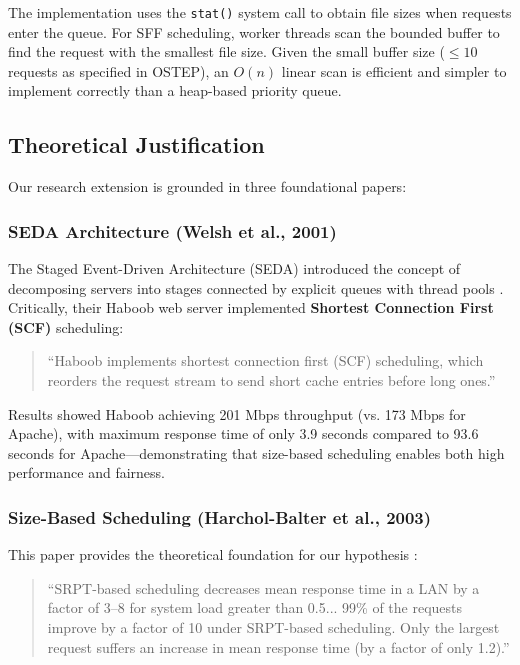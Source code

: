 \documentclass[11pt,a4paper]{article}
\begin{document}
The implementation uses the \texttt{stat()} system call to obtain file sizes when requests enter the queue. For SFF scheduling, worker threads scan the bounded buffer to find the request with the smallest file size. Given the small buffer size ($\leq 10$ requests as specified in OSTEP), an $O(n)$ linear scan is efficient and simpler to implement correctly than a heap-based priority queue.

\subsection{Theoretical Justification}

Our research extension is grounded in three foundational papers:

\subsubsection{SEDA Architecture (Welsh et al., 2001)}

The Staged Event-Driven Architecture (SEDA) introduced the concept of decomposing servers into stages connected by explicit queues with thread pools \cite{welsh2001}. Critically, their Haboob web server implemented \textbf{Shortest Connection First (SCF)} scheduling:

\begin{quote}
``Haboob implements shortest connection first (SCF) scheduling, which reorders the request stream to send short cache entries before long ones.'' \cite{welsh2001}
\end{quote}

Results showed Haboob achieving 201 Mbps throughput (vs. 173 Mbps for Apache), with maximum response time of only 3.9 seconds compared to 93.6 seconds for Apache---demonstrating that size-based scheduling enables both high performance and fairness.

\subsubsection{Size-Based Scheduling (Harchol-Balter et al., 2003)}

This paper provides the theoretical foundation for our hypothesis \cite{harchol2003}:

\begin{quote}
``SRPT-based scheduling decreases mean response time in a LAN by a factor of 3--8 for system load greater than 0.5... 99\% of the requests improve by a factor of 10 under SRPT-based scheduling. Only the largest request suffers an increase in mean response time (by a factor of only 1.2).''
\end{quote}
\end{document}
